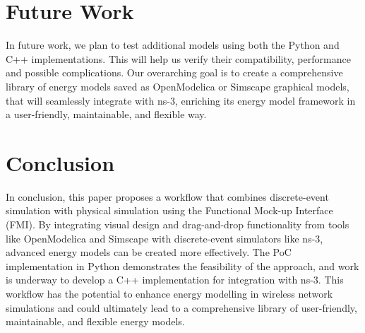 \documentclass[conference]{IEEEtran}
\def\ns3{ns-3}
\begin{document}
\section{Future Work}

In future work, we plan to test additional models using both the Python and C++ implementations. This will help us verify their compatibility, performance and possible complications.
Our overarching goal is to create a comprehensive library of energy models saved as OpenModelica or Simscape graphical models, that will seamlessly integrate with \ns3, enriching its energy model framework in a user-friendly, maintainable, and flexible way.

\section{Conclusion}
In conclusion, this paper proposes a workflow that combines discrete-event simulation with physical simulation using the Functional Mock-up Interface (FMI). By integrating visual design and drag-and-drop functionality from tools like OpenModelica and Simscape with discrete-event simulators like ns-3, advanced energy models can be created more effectively. The PoC implementation in Python demonstrates the feasibility of the approach, and work is underway to develop a C++ implementation for integration with ns-3. This workflow has the potential to enhance energy modelling in wireless network simulations and could ultimately lead to a comprehensive library of user-friendly, maintainable, and flexible energy models.

\printbibliography
\end{document}
